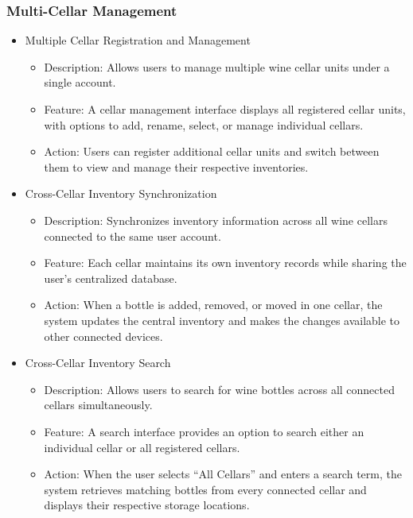 \documentclass[conference]{IEEEtran}
\begin{document}
\subsubsection{Multi-Cellar Management}
\begin{itemize}
    \item Multiple Cellar Registration and Management
    \begin{itemize}
        \item Description: Allows users to manage multiple wine cellar units under a single account.
        \item Feature: A cellar management interface displays all registered cellar units, with options to add, rename, select, or manage individual cellars.
        \item Action: Users can register additional cellar units and switch between them to view and manage their respective inventories.
    \end{itemize}

    \item Cross-Cellar Inventory Synchronization
    \begin{itemize}
        \item Description: Synchronizes inventory information across all wine cellars connected to the same user account.
        \item Feature: Each cellar maintains its own inventory records while sharing the user's centralized database.
        \item Action: When a bottle is added, removed, or moved in one cellar, the system updates the central inventory and makes the changes available to other connected devices.
    \end{itemize}

    \item Cross-Cellar Inventory Search
    \begin{itemize}
        \item Description: Allows users to search for wine bottles across all connected cellars simultaneously.
        \item Feature: A search interface provides an option to search either an individual cellar or all registered cellars.
        \item Action: When the user selects ``All Cellars'' and enters a search term, the system retrieves matching bottles from every connected cellar and displays their respective storage locations.
    \end{itemize}
\end{itemize}
\end{document}
